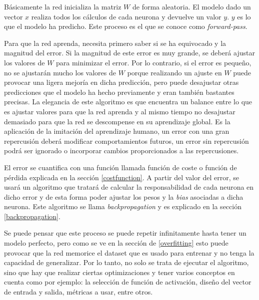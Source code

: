 Básicamente la red inicializa la matriz $W$ de forma aleatoria. El modelo dado un vector $x$ realiza todos los cálculos de cada neurona y devuelve un valor $y$. $y$ es lo que el modelo ha predicho. Este proceso es el que se conoce como \textit{forward-pass}.
\newline

Para que la red aprenda, necesita primero saber si se ha equivocado y la magnitud del error. Si la magnitud de este error es muy grande, se deberá ajustar los valores de $W$ para minimizar el error. Por lo contrario, si el error es pequeño, no se ajustarán mucho los valores de $W$ porque realizando un ajuste en $W$ puede provocar una ligera mejoría en dicha predicción, pero puede desajustar otras predicciones que el modelo ha hecho previamente y eran también bastantes precisas. La elegancia de este algoritmo es que encuentra un balance entre lo que es ajustar valores para que la red aprenda y al mismo tiempo no desajustar demasiado para que la red se descompense en su aprendizaje global. Es la aplicación de la imitación del aprendizaje humano, un error con una gran repercusión deberá modificar comportamientos futuros, un error sin repercusión podrá ser ignorado o incorporar cambios proporcionados a las repercusiones.
\newline

El error se cuantifica con una función llamada función de coste o función de pérdida explicada en la sección \ref{costfunction}. A partir del valor del error, se usará un algoritmo que tratará de calcular la responsabilidad de cada neurona en dicho error y de esta forma poder ajustar los pesos y la \textit{bias} asociadas a dicha neurona. Este algoritmo se llama \textit{backpropagation} y es explicado en la sección \ref{backpropagation}.
\newline

Se puede pensar que este proceso se puede repetir infinitamente hasta tener un modelo perfecto, pero como se ve en la sección de \ref{overfitting} esto puede provocar que la red memorice el dataset que es usado para entrenar y no tenga la capacidad de generalizar. Por lo tanto, no solo se trata de ejecutar el algoritmo, sino que hay que realizar ciertas optimizaciones y tener varios conceptos en cuenta como por ejemplo: la selección de función de activación, diseño del vector de entrada y salida, métricas a usar, entre otros.
\newline

